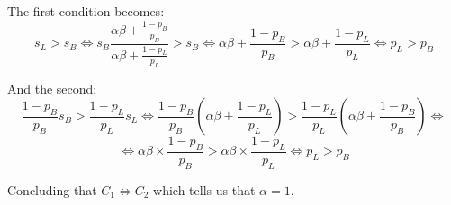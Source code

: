\documentclass{article}
\begin{document}
The first condition becomes:
$$
    s_{L} > s_{B} \Leftrightarrow
    s_{B} \frac{ \alpha \beta + \frac{1-p_{B}}{p_{B}} }{ \alpha \beta +
                        \frac{1-p_{L}}{p_{L}} } > s_{B} \Leftrightarrow
    \alpha \beta + \frac{1-p_{B}}{p_{B}}  > \alpha \beta +
                                  \frac{1-p_{L}}{p_{L}} \Leftrightarrow
    p_{L} > p_{B}
$$

And the second:
$$
    \frac{1-p_{B}}{p_{B}}s_{B} > \frac{1-p_{L}}{p_{L}}s_{L}
                                                        \Leftrightarrow
    \frac{1-p_{B}}{p_{B}} \left( \alpha \beta + \frac{1-p_{L}}{p_{L}}
    \right) > \frac{1-p_{L}}{p_{L}} \left( \alpha \beta +
                         \frac{1-p_{B}}{p_{B}} \right)  \Leftrightarrow
$$
$$
    \Leftrightarrow \alpha \beta \times \frac{1-p_{B}}{p_{B}} > \alpha
                     \beta \times \frac{1-p_{L}}{p_{L}} \Leftrightarrow
    p_{L} > p_{B}
$$

Concluding that $C_{1} \Leftrightarrow C_{2}$ which tells us that 
$\alpha=1$.
\end{document}
